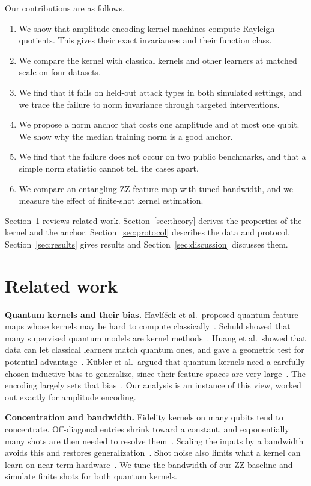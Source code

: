 \documentclass[pdflatex,sn-mathphys-num,lineno]{sn-jnl}
\theoremstyle{thmstyleone}
\begin{document}
Our contributions are as follows.
\begin{enumerate}
\item We show that amplitude-encoding kernel machines compute Rayleigh quotients.
  This gives their exact invariances and their function class.
\item We compare the kernel with classical kernels and other learners at matched
  scale on four datasets.
\item We find that it fails on held-out attack types in both simulated settings,
  and we trace the failure to norm invariance through targeted interventions.
\item We propose a norm anchor that costs one amplitude and at most one qubit. We
  show why the median training norm is a good anchor.
\item We find that the failure does not occur on two public benchmarks, and that
  a simple norm statistic cannot tell the cases apart.
\item We compare an entangling ZZ feature map with tuned bandwidth, and we measure
  the effect of finite-shot kernel estimation.
\end{enumerate}

Section~\ref{sec:related} reviews related work. Section~\ref{sec:theory} derives
the properties of the kernel and the anchor. Section~\ref{sec:protocol} describes
the data and protocol. Section~\ref{sec:results} gives results and
Section~\ref{sec:discussion} discusses them.

\section{Related work}
\label{sec:related}

\textbf{Quantum kernels and their bias.} Havl\'i\v{c}ek et al.\ proposed quantum
feature maps whose kernels may be hard to compute
classically~\cite{havlicek2019supervised}. Schuld showed that many supervised
quantum models are kernel methods~\cite{schuld2021supervised}. Huang et al.\
showed that data can let classical learners match quantum ones, and gave a
geometric test for potential advantage~\cite{huang2021power}. K\"ubler et al.\
argued that quantum kernels need a carefully chosen inductive bias to generalize,
since their feature spaces are very large~\cite{kubler2021inductive}. The encoding
largely sets that bias~\cite{schuld2021effect,larose2020robust}. Our analysis is
an instance of this view, worked out exactly for amplitude encoding.

\textbf{Concentration and bandwidth.} Fidelity kernels on many qubits tend to
concentrate. Off-diagonal entries shrink toward a constant, and exponentially many
shots are then needed to resolve them~\cite{thanasilp2024exponential}. Scaling the
inputs by a bandwidth avoids this and restores
generalization~\cite{shaydulin2022importance,canatar2022bandwidth}. Shot noise
also limits what a kernel can learn on near-term
hardware~\cite{wang2021towards,hubregtsen2022training}. We tune the bandwidth of
our ZZ baseline and simulate finite shots for both quantum kernels.
\end{document}
